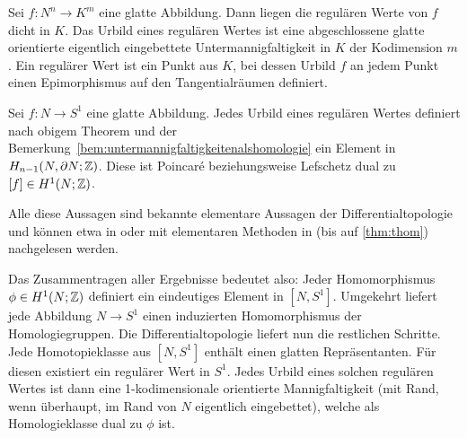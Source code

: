	\begin{thm}
		Sei $f:N^n \to K^m$ eine glatte Abbildung. Dann liegen die regulären Werte von $f$ dicht in $K$. Das Urbild eines regulären Wertes ist eine abgeschlossene glatte orientierte eigentlich eingebettete Untermannigfaltigkeit in $K$ der Kodimension $m$. Ein regulärer Wert ist ein Punkt aus $K$, bei dessen Urbild $f$ an jedem Punkt einen Epimorphismus auf den Tangentialräumen definiert. 
	\end{thm}
	\begin{thm}[Thom]
	\label{thm:thom}
		Sei $f:N \to S^1$ eine glatte Abbildung. Jedes Urbild eines regulären Wertes definiert nach obigem Theorem und der Bemerkung~\ref{bem:untermannigfaltigkeitenalshomologie} ein Element in $H_{n-1}(N,\partial N;\mathbb{Z})$. Diese ist Poincaré beziehungsweise Lefschetz dual zu $[f]\in H^1(N;\mathbb{Z})$.
	\end{thm}
	Alle diese Aussagen sind bekannte elementare Aussagen der Differentialtopologie und können etwa in \cite{Kreck.2010} oder mit elementaren Methoden in \cite{Hirsch.1991} (bis auf \ref{thm:thom}) nachgelesen werden. 

	Das Zusammentragen aller Ergebnisse bedeutet also: Jeder Homomorphismus $\phi \in H^1(N;\mathbb{Z})$ definiert ein eindeutiges Element in $[N,S^1]$. Umgekehrt liefert jede Abbildung $N\to S^1$ einen induzierten Homomorphismus der Homologiegruppen. Die Differentialtopologie liefert nun die restlichen Schritte. Jede Homotopieklasse aus $[N,S^1]$ enthält einen glatten Repräsentanten. Für diesen existiert ein regulärer Wert in $S^1$. Jedes Urbild eines solchen regulären Wertes ist dann eine 1-kodimensionale orientierte Mannigfaltigkeit (mit Rand, wenn überhaupt, im Rand von $N$ eigentlich eingebettet), welche als Homologieklasse dual zu $\phi$ ist.


